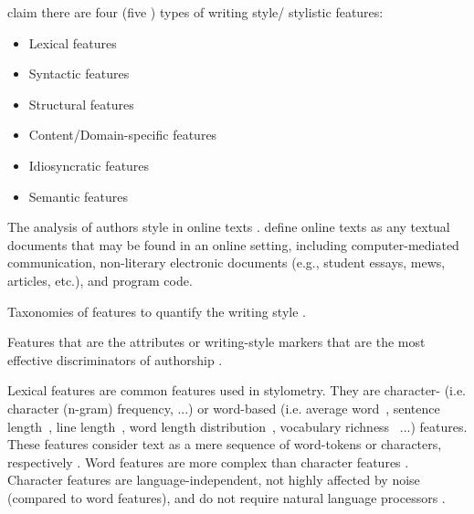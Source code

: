 \citet{elmanarelbouanani_authorship_2014} claim there are four (five \cite{abbasi_writeprints_2008,neal_surveying_2018}) types of writing style/ stylistic features:
\begin{itemize}
    \item Lexical features \citet{elmanarelbouanani_authorship_2014,abbasi_writeprints_2008,neal_surveying_2018}
    \item Syntactic features \citet{elmanarelbouanani_authorship_2014,abbasi_writeprints_2008,neal_surveying_2018}
    \item Structural features \citet{elmanarelbouanani_authorship_2014,abbasi_writeprints_2008,neal_surveying_2018}
    \item Content/Domain-specific features \citet{elmanarelbouanani_authorship_2014,abbasi_writeprints_2008,neal_surveying_2018}
    \item Idiosyncratic features \citet{abbasi_writeprints_2008}
    \item Semantic features \cite{neal_surveying_2018}
\end{itemize}

\begin{definition}
    The analysis of authors style in online texts \cite{abbasi_writeprints_2008}.
    \citet{abbasi_writeprints_2008} define online texts as any textual documents that may be found in an online setting, 
    including computer-mediated communication, non-literary electronic documents (e.g., student essays, mews, articles, etc.), and program code.
\end{definition}

\begin{definition}
    Taxonomies of features to quantify the writing style \cite{stamatatos_survey_2009}.
\end{definition}

\begin{definition}
    Features that are the attributes or writing-style markers that are the most effective discriminators of authorship \cite{abbasi_writeprints_2008}.
\end{definition}

\begin{definition}
    Lexical features are common features used in stylometry.
    They are character- (i.e. character (n-gram) frequency, ...) 
    or word-based (i.e. average word~\cite{stein_intrinsic_2011}, sentence length~\cite{stein_intrinsic_2011,abbasi_writeprints_2008}, 
    line length~\cite{abbasi_writeprints_2008}, word length distribution~\cite{abbasi_writeprints_2008}, 
    vocabulary richness~\cite{abbasi_writeprints_2008,neal_surveying_2018} ...) features. 
    These features consider text as a mere sequence of word-tokens or characters, respectively \cite{stamatatos_survey_2009}.
    Word features are more complex than character features \cite{stamatatos_survey_2009}.
    Character features are language-independent, not highly affected by noise (compared to word features), 
    and do not require natural language processors \cite{neal_surveying_2018}.
\end{definition}

